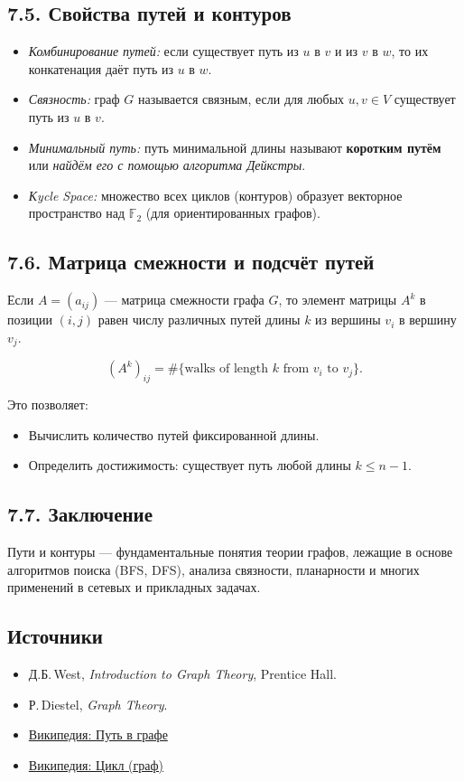 \documentclass{article}
\begin{document}
\subsection*{7.5. Свойства путей и контуров}

\begin{itemize}[leftmargin=*]
  \item \emph{Комбинирование путей:} если существует путь из $u$ в $v$ и из $v$ в $w$, то их конкатенация даёт путь из $u$ в $w$.
  \item \emph{Связность:} граф $G$ называется связным, если для любых $u,v\in V$ существует путь из $u$ в $v$.
  \item \emph{Минимальный путь:} путь минимальной длины называют \textbf{коротким путём} или \emph{найдём его с помощью алгоритма Дейкстры}.
  \item \emph{Кycle Space:} множество всех циклов (контуров) образует векторное пространство над $\mathbb{F}_2$ (для ориентированных графов).
\end{itemize}

\subsection*{7.6. Матрица смежности и подсчёт путей}

Если $A = (a_{ij})$ — матрица смежности графа $G$, то элемент матрицы $A^k$ в позиции $(i,j)$ равен числу различных путей длины $k$ из вершины $v_i$ в вершину $v_j$.

\[
  (A^k)_{ij} = \#\{\text{walks of length }k \text{ from }v_i\text{ to }v_j\}.
\]

Это позволяет:
\begin{itemize}[leftmargin=*]
  \item Вычислить количество путей фиксированной длины.
  \item Определить достижимость: существует путь любой длины $k\le n-1$.
\end{itemize}

\subsection*{7.7. Заключение}

Пути и контуры — фундаментальные понятия теории графов, лежащие в основе алгоритмов поиска (BFS, DFS), анализа связности, планарности и многих применений в сетевых и прикладных задачах.

\subsection*{Источники}

\begin{itemize}
  \item Д.Б.\,West, \emph{Introduction to Graph Theory}, Prentice Hall.
  \item Р.\,Diestel, \emph{Graph Theory}.
  \item \href{https://ru.wikipedia.org/wiki/Путь_в_графе}{Википедия: Путь в графе}
  \item \href{https://ru.wikipedia.org/wiki/Цикл_в_графе}{Википедия: Цикл (граф)}
\end{itemize}
\end{document}
